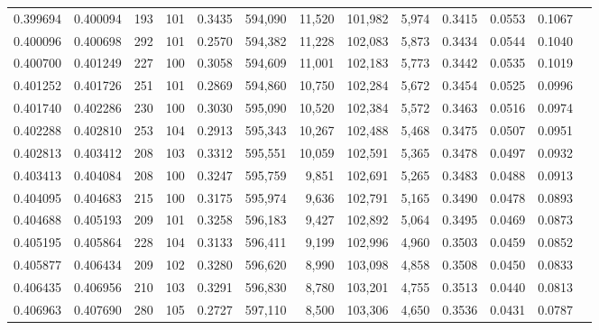 \begin{tabular}{rrrrrrrrrrrrr}
0.399694 & 0.400094 &   193 & 101 &                                     0.3435 & 594,090 &  11,520 & 101,982 &   5,974 & 0.3415 & 0.0553 & 0.1067 \\
0.400096 & 0.400698 &   292 & 101 &                                     0.2570 & 594,382 &  11,228 & 102,083 &   5,873 & 0.3434 & 0.0544 & 0.1040 \\
0.400700 & 0.401249 &   227 & 100 &                                     0.3058 & 594,609 &  11,001 & 102,183 &   5,773 & 0.3442 & 0.0535 & 0.1019 \\
0.401252 & 0.401726 &   251 & 101 &                                     0.2869 & 594,860 &  10,750 & 102,284 &   5,672 & 0.3454 & 0.0525 & 0.0996 \\
0.401740 & 0.402286 &   230 & 100 &                                     0.3030 & 595,090 &  10,520 & 102,384 &   5,572 & 0.3463 & 0.0516 & 0.0974 \\
0.402288 & 0.402810 &   253 & 104 &                                     0.2913 & 595,343 &  10,267 & 102,488 &   5,468 & 0.3475 & 0.0507 & 0.0951 \\
0.402813 & 0.403412 &   208 & 103 &                                     0.3312 & 595,551 &  10,059 & 102,591 &   5,365 & 0.3478 & 0.0497 & 0.0932 \\
0.403413 & 0.404084 &   208 & 100 &                                     0.3247 & 595,759 &   9,851 & 102,691 &   5,265 & 0.3483 & 0.0488 & 0.0913 \\
0.404095 & 0.404683 &   215 & 100 &                                     0.3175 & 595,974 &   9,636 & 102,791 &   5,165 & 0.3490 & 0.0478 & 0.0893 \\
0.404688 & 0.405193 &   209 & 101 &                                     0.3258 & 596,183 &   9,427 & 102,892 &   5,064 & 0.3495 & 0.0469 & 0.0873 \\
0.405195 & 0.405864 &   228 & 104 &                                     0.3133 & 596,411 &   9,199 & 102,996 &   4,960 & 0.3503 & 0.0459 & 0.0852 \\
0.405877 & 0.406434 &   209 & 102 &                                     0.3280 & 596,620 &   8,990 & 103,098 &   4,858 & 0.3508 & 0.0450 & 0.0833 \\
0.406435 & 0.406956 &   210 & 103 &                                     0.3291 & 596,830 &   8,780 & 103,201 &   4,755 & 0.3513 & 0.0440 & 0.0813 \\
0.406963 & 0.407690 &   280 & 105 &                                     0.2727 & 597,110 &   8,500 & 103,306 &   4,650 & 0.3536 & 0.0431 & 0.0787 \\

\end{tabular}
